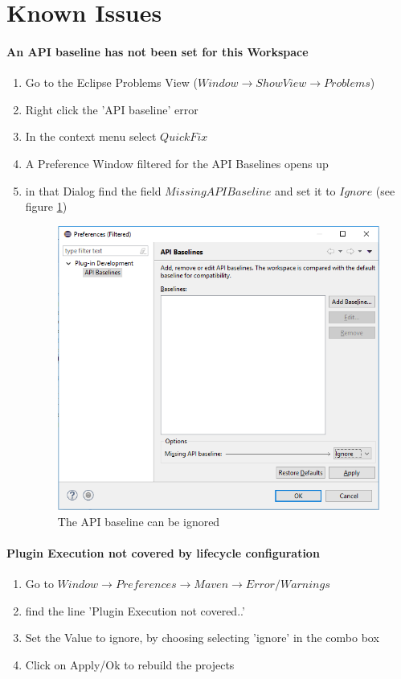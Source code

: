 \section{Known Issues}
\label{chap:issues}
\paragraph{An API baseline has not been set for this Workspace}
\begin{enumerate}
\item Go to the Eclipse Problems View ($Window\rightarrow Show View\rightarrow Problems$)
\item Right click the 'API baseline' error 
\item In the context menu select $Quick Fix$
\item A Preference Window filtered for the API Baselines opens up
\item in that Dialog find the field $Missing API Baseline$ and set it to $Ignore$ (see figure \ref{fig:APIerror})
\begin{figure}[H]
\includegraphics[scale=0.5]{images/ignoreAPIError.png}
\caption{The API baseline can be ignored}
\label{fig:APIerror}
\end{figure}
\end{enumerate}
\paragraph{Plugin Execution not covered by lifecycle configuration} 
\begin{enumerate}
\item Go to $Window\rightarrow Preferences\rightarrow Maven\rightarrow Error/Warnings$
\item find the line 'Plugin Execution not covered..'
\item Set the Value to ignore, by choosing selecting 'ignore' in the combo box
\item Click on Apply/Ok to rebuild the projects
\end{enumerate} 
